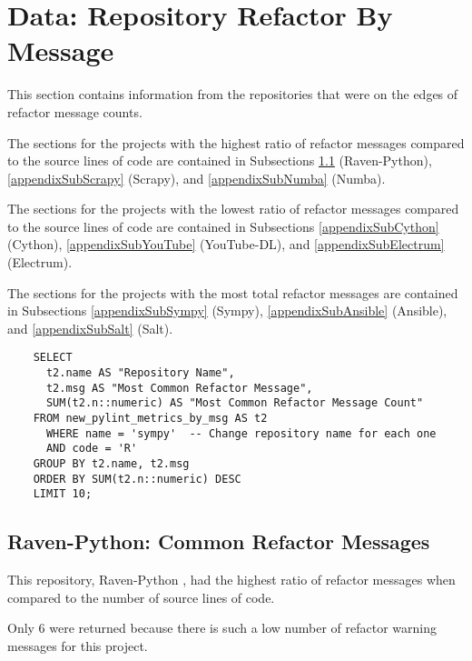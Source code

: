 \newpage
\section{Data: Repository Refactor By Message} \label{appendixRefactorMsgCounts}

This section contains information from the repositories that were on the edges of refactor message counts.

The sections for the projects with the highest ratio of refactor messages compared to the source lines of code are contained in Subsections \ref{appendixSubRavenPython} (Raven-Python), \ref{appendixSubScrapy} (Scrapy), and \ref{appendixSubNumba} (Numba).

The sections for the projects with the lowest ratio of refactor messages compared to the source lines of code are contained in Subsections \ref{appendixSubCython} (Cython), \ref{appendixSubYouTube} (YouTube-DL), and \ref{appendixSubElectrum} (Electrum).

The sections for the projects with the most total refactor messages are contained in Subsections \ref{appendixSubSympy} (Sympy),  \ref{appendixSubAnsible} (Ansible), and \ref{appendixSubSalt} (Salt).

\begin{singlespace}
  \begin{verbatim}
    SELECT
      t2.name AS "Repository Name",
      t2.msg AS "Most Common Refactor Message",
      SUM(t2.n::numeric) AS "Most Common Refactor Message Count"
    FROM new_pylint_metrics_by_msg AS t2
      WHERE name = 'sympy'  -- Change repository name for each one
      AND code = 'R'
    GROUP BY t2.name, t2.msg
    ORDER BY SUM(t2.n::numeric) DESC
    LIMIT 10;
  \end{verbatim}
\end{singlespace}


\newpage
\subsection{Raven-Python: Common Refactor Messages} \label{appendixSubRavenPython}
This repository, Raven-Python \cite{data:raven-python}, had the highest ratio of refactor messages when compared to the number of source lines of code.

Only 6 were returned because there is such a low number of refactor warning messages for this project.

